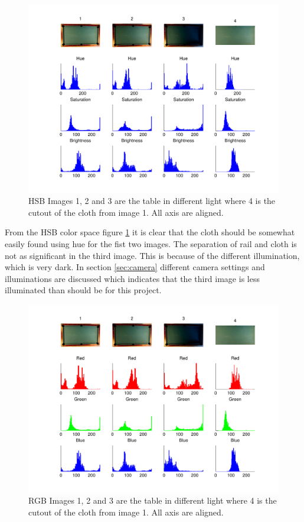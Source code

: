 \begin{figure}[htb]
\begin{center}
\leavevmode
\includegraphics[width=1\textwidth]{images/hsv_hist_table}
\end{center}
\caption{HSB Images 1, 2 and 3 are the table in different light where 4 is the cutout of the cloth from image 1. All axis are aligned.}
\label{fig:tablehsv}
\end{figure}
From the HSB color space figure \ref{fig:tablehsv} it is clear that the cloth should be somewhat easily found using hue for the fist two images. The separation of rail and cloth is not as significant in the third image. This is because of the different illumination, which is very dark. In section \ref{sec:camera} different camera settings and illuminations are discussed which indicates that the third image is less illuminated than should be for this project.
\begin{figure}[htb]
\begin{center}
\leavevmode
\includegraphics[width=1\textwidth]{images/rgb_hist_table}
\end{center}
\caption{RGB Images 1, 2 and 3 are the table in different light where 4 is the cutout of the cloth from image 1. All axis are aligned.}
\label{fig:tablergb}
\end{figure}
